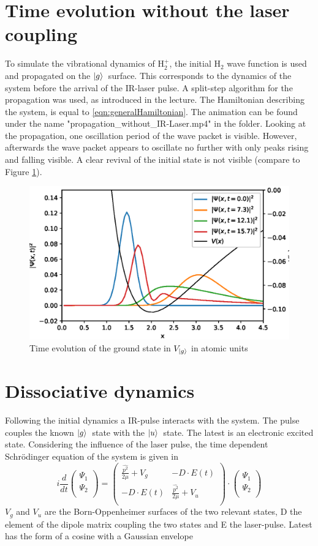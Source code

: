\documentclass[12pt]{article}
\newcommand{\gr}{$\ket{g}$}
\newcommand{\us}{$\ket{u}$}
\newcommand{\psiv}{\begin{pmatrix}\Psi_1\\ \Psi_2\\ \end{pmatrix}}
\begin{document}
\section{Time evolution without the laser coupling}
To simulate the vibrational dynamics of H$_2^+$, the initial H$_2$ wave function is used and propagated on the \gr\ surface. This corresponds to the dynamics of the system before the arrival of the IR-laser pulse. A split-step algorithm for the propagation was used, as introduced in the lecture. The Hamiltonian describing the system, is equal to \eqref{eqn:generalHamiltonian}.
The animation can be found under the name "propagation\_without\_IR-Laser.mp4"
in the folder.
Looking at the propagation, one oscillation period of the wave packet is visible. However, afterwards the wave packet appears to oscillate no further with only peaks rising and falling visible. A clear revival of the initial state is not visible (compare to Figure \ref{fig:withoutIR}).
\begin{figure}[htb]
    \centering
    \includegraphics[width=1\textwidth]{woIR.eps}
    \caption{Time evolution of the ground state in $V_{\ket{g}}$ in atomic units }\label{fig:withoutIR}
\end{figure}


\section{Dissociative dynamics}
Following the initial dynamics a IR-pulse interacts with the system. The pulse couples  the known \gr \ state with the \us \ state. The latest is an electronic excited state. Considering the influence of the laser pulse, the time dependent Schr\"odinger equation of the system is given in \cite{PhysRevA.93.012507}
\begin{equation}\label{eqn:dissociativeDyn}
i
\frac{d}{dt}
\psiv
=
\begin{pmatrix}
\frac{\hat{p^2}}{2\mu}+V_g & -D\cdot E(t)\\
-D\cdot E(t) & \frac{\hat{p^2}}{2\mu}+V_u\\
\end{pmatrix}
\cdot
\psiv
\end{equation}
$V_g$ and $V_u$ are the Born-Oppenheimer surfaces of the two relevant states, D the element of the dipole matrix coupling the two states and E the laser-pulse.
Latest has the form of a cosine with a Gaussian envelope
\end{document}
